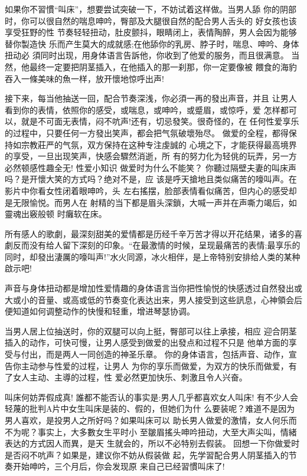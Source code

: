 \documentclass[12pt,UTF8]{ctexbook}
\begin{document}
如果你不習慣“叫床”，想要尝试突破一下，不妨试着这样做。当男人舔
你的阴部时，你可以很自然的喘息呻吟，臀部及大腿很自然的配合男人舌头的
好女孩也该享受狂野的性
节奏轻轻扭动，肚皮颤抖，眼睛闭上，表情陶醉，男人会因为能够替你製造快
乐而产生莫大的成就感;在他舔你的乳房、脖子时，喘息、呻吟、身体扭动必
須同时出现，用身体语言告訴他，你收到了他爱的服务，而且很满意。
当然，他最终一定要把阴茎插入，在他插入的那一刹那，你一定要像被
餵食的海豹吞入一條美味的魚一样，放开懷地惊呼出声!

接下来，每当他抽送一回，配合节奏深浅，你必須一再的發出声音，并且
让男人看到你的表情，依照你的感受，或喘息，或呻吟，或蹙眉，或惊呼，爱
怎样都可以，就是不可面无表情，闷不吭声!还有，切忌發笑。很奇怪的，在
任何性爱享乐的过程中，只要任何一方發出笑声，都会把气氛破壞殆尽。
做爱的全程，都得保持如宗教莊严的气氛，双方保持在这种专注虔誠的
心境之下，才能获得最高境界的享受，一旦出现笑声，快感会驟然消逝，所
有的努力化为轻佻的玩弄，另一方必然顿感性趣全无!
性爱小知识
做爱时为什么不能笑？
你聽过隔壁夫妻的叫床声吗？是开懷大笑的方式吗？绝对不是，应
该是呼天搶地且类似痛苦的嚎叫声。在影片中你看女性闭着眼呻吟，头
左右搖摆，脸部表情看似痛苦，但内心的感受却是无限愉悦。而男人在
射精的当下都是眉头深鎖，大喊一声并在声嘶力竭后，如靈魂出竅般顿
时癱软在床。

所有感人的歌劇，最深刻甜美的爱情都是历经千辛万苦才得以开花结果，诸多的喜劇反而没有给人留下深刻的印象。“在最激情的时候，呈现最痛苦的表情;最享乐的同时，却發出淒厲的嚎叫声!”水火同源，冰火相伴，是上帝特别安排给人类的某种啟示吧!

声音与身体扭动都是增加性爱情趣的身体语言当你把性愉悦的快感透过自然發出或大或小的音量、或高或低的节奏变化表达出来，男人接受到这些訊息，心神領会后便知道如何调整动作的快慢和轻重，增进琴瑟协调。

当男人居上位抽送时，你的双腿可以向上挺，臀部可以往上承接，相应
迎合阴茎插入的动作，可快可慢，让男人感受到做爱的出發点和过程不只是
他单方面的享受与付出，而是两人一同创造的神圣乐章。
你的身体语言，包括声音、动作，宣告你主动参与性爱的过程，让男人
为你的享乐而做爱，为双方的快乐而做爱，有了女人主动、主導的过程，性
爱必然更加快乐、刺激且令人兴奋。

叫床何妨弄假成真!
誰都不能否认的事实是:男人几乎都喜欢女人叫床!
有不少人会轻蔑的批判A片中女生叫床是装的、假的，但她们为什
么要装呢？难道不是因为男人喜欢，是投男人之所好吗？如果叫床可以
助长男人做爱的激情，女人何乐而不为呢？事实上，大多數女生平时小
至皺眉搖头呻吟扭动，大至大声尖叫，情緒表达的方式因人而異，是天
生就会的，所以不必特别去假装。
回想一下你做爱时是否闷不吭声？如果是，建议你不妨从假装做
起，先学習配合男人阴茎插入的节奏开始呻吟，三个月后，你会发现原
来自己已经習慣叫床了!
\end{document}
